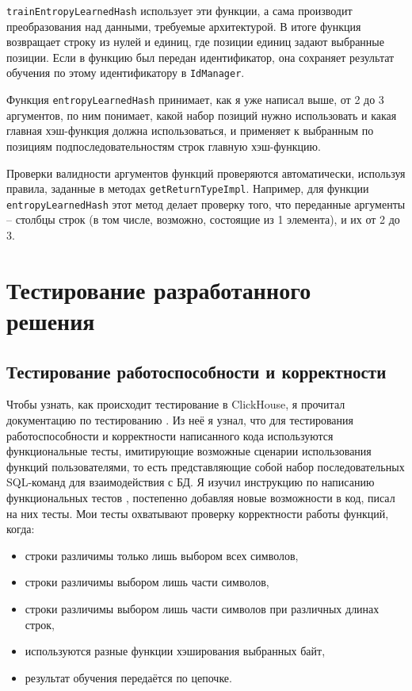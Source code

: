 \documentclass[a4paper,12pt]{extarticle}
\begin{document}
\begin{sloppypar}
\texttt{trainEntropyLearnedHash} использует эти функции, а сама производит преобразования над данными, требуемые архитектурой. В итоге функция возвращает строку из нулей и единиц, где позиции единиц задают выбранные позиции. Если в функцию был передан идентификатор, она сохраняет результат обучения по этому идентификатору в \texttt{IdManager}.

Функция \texttt{entropyLearnedHash} принимает, как я уже написал выше, от 2 до 3 аргументов, по ним понимает, какой набор позиций нужно использовать и какая главная хэш-функция должна использоваться, и применяет к выбранным по позициям подпоследовательностям строк главную хэш-функцию.

Проверки валидности аргументов функций проверяются автоматически, используя правила, заданные в методах \texttt{getReturnTypeImpl}. Например, для функции \texttt{entropyLearnedHash} этот метод делает проверку того, что переданные аргументы -- столбцы строк (в том числе, возможно, состоящие из 1 элемента), и их от 2 до 3.

\newpage

\section{Тестирование разработанного решения}
\subsection{Тестирование работоспособности и корректности}
Чтобы узнать, как происходит тестирование в ClickHouse, я прочитал документацию по тестированию \cite{clickhouse_testing}. Из неё я узнал, что для тестирования работоспособности и корректности написанного кода используются функциональные тесты, имитирующие возможные сценарии использования функций пользователями, то есть представляющие собой набор последовательных SQL-команд для взаимодействия с БД. Я изучил инструкцию по написанию функциональных тестов \cite{clickhouse_sql_test_queries}, постепенно добавляя новые возможности в код, писал на них тесты. Мои тесты охватывают проверку корректности работы функций, когда:

\begin{itemize}
	\item строки различимы только лишь выбором всех символов,
	\item строки различимы выбором лишь части символов,
	\item строки различимы выбором лишь части символов при различных длинах строк,
	\item используются разные функции хэширования выбранных байт,
	\item результат обучения передаётся по цепочке.
\end{itemize}


\end{sloppypar}
\end{document}
